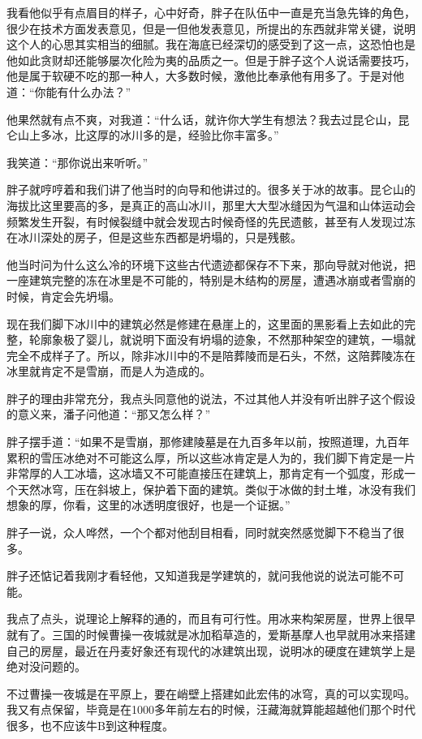 我看他似乎有点眉目的样子，心中好奇，胖子在队伍中一直是充当急先锋的角色，很少在技术方面发表意见，但是一但他发表意见，所提出的东西就非常关键，说明这个人的心思其实相当的细腻。我在海底已经深切的感受到了这一点，这恐怕也是他如此贪财却还能够屡次化险为夷的品质之一。但是于胖子这个人说话需要技巧，他是属于软硬不吃的那一种人，大多数时候，激他比奉承他有用多了。于是对他道：“你能有什么办法？”

他果然就有点不爽，对我道：“什么话，就许你大学生有想法？我去过昆仑山，昆仑山上多冰，比这厚的冰川多的是，经验比你丰富多。”

我笑道：“那你说出来听听。”

胖子就哼哼着和我们讲了他当时的向导和他讲过的。很多关于冰的故事。昆仑山的海拔比这里要高的多，是真正的高山冰川，那里大大型冰缝因为气温和山体运动会频繁发生开裂，有时候裂缝中就会发现古时候奇怪的先民遗骸，甚至有人发现过冻在冰川深处的房子，但是这些东西都是坍塌的，只是残骸。

他当时问为什么这么冷的环境下这些古代遗迹都保存不下来，那向导就对他说，把一座建筑完整的冻在冰里是不可能的，特别是木结构的房屋，遭遇冰崩或者雪崩的时候，肯定会先坍塌。

现在我们脚下冰川中的建筑必然是修建在悬崖上的，这里面的黑影看上去如此的完整，轮廓象极了婴儿，就说明下面没有坍塌的迹象，不然那种架空的建筑，一塌就完全不成样子了。所以，除非冰川中的不是陪葬陵而是石头，不然，这陪葬陵冻在冰里就肯定不是雪崩，而是人为造成的。

胖子的理由非常充分，我点头同意他的说法，不过其他人并没有听出胖子这个假设的意义来，潘子问他道：“那又怎么样？”

胖子摆手道：“如果不是雪崩，那修建陵墓是在九百多年以前，按照道理，九百年累积的雪压冰绝对不可能这么厚，所以这些冰肯定是人为的，我们脚下肯定是一片非常厚的人工冰墙，这冰墙又不可能直接压在建筑上，那肯定有一个弧度，形成一个天然冰穹，压在斜坡上，保护着下面的建筑。类似于冰做的封土堆，冰没有我们想象的厚，你看，这里的冰透明度很好，也是一个证据。”

胖子一说，众人哗然，一个个都对他刮目相看，同时就突然感觉脚下不稳当了很多。

胖子还惦记着我刚才看轻他，又知道我是学建筑的，就问我他说的说法可能不可能。

我点了点头，说理论上解释的通的，而且有可行性。用冰来构架房屋，世界上很早就有了。三国的时候曹操一夜城就是冰加稻草造的，爱斯基摩人也早就用冰来搭建自己的房屋，最近在丹麦好象还有现代的冰建筑出现，说明冰的硬度在建筑学上是绝对没问题的。

不过曹操一夜城是在平原上，要在峭壁上搭建如此宏伟的冰穹，真的可以实现吗。我又有点保留，毕竟是在1000多年前左右的时候，汪藏海就算能超越他们那个时代很多，也不应该牛B到这种程度。

